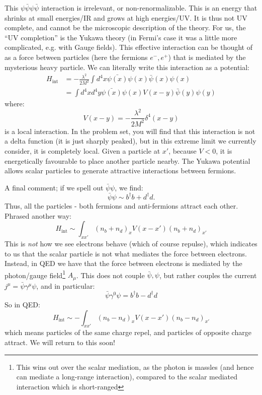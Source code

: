 This $\psi\bar{\psi}\psi\bar{\psi}$ interaction is irrelevant, or non-renormalizable. This is an energy that shrinks at small energies/IR and grows at high energies/UV. It is thus not UV complete, and cannot be the microscopic description of the theory. For us, the ``UV completion'' is the Yukawa theory (in Fermi's case it was a little more complicated, e.g. with Gauge fields). This effective interaction can be thought of as a force between particles (here the fermions $e^-, e^+$) that is mediated by the mysterious heavy particle. We can literally write this interaction as a potential:
\begin{equation}
    \begin{split}
        H_{\text{int}} &= -\frac{\lambda^2}{2M^2}\int d^4x \bar{\psi(x)}\psi(x)\bar{\psi}(x)\psi(x)
        \\ &=\int d^4xd^4y \bar{\psi(x)}\psi(x)V(x-y)\bar{\psi}(y)\psi(y)
    \end{split}
\end{equation}
where:
\begin{equation}
    V(x-y) = -\frac{\lambda^2}{2M^2}\delta^4(x-y)
\end{equation}
is a local interaction. In the problem set, you will find that this interaction is not a delta function (it is just sharply peaked), but in this extreme limit we currently consider, it is completely local. Given a particle at $x'$, because $V < 0$, it is energetically favourable to place another particle nearby. The Yukawa potential allows scalar particles to generate attractive interactions between fermions.

A final comment; if we spell out $\bar{\psi}\psi$, we find:
\begin{equation}
    \bar{\psi}\psi \sim b^\dag b + d^\dag d.
\end{equation}
Thus, all the particles - both fermions and anti-fermions attract each other. Phrased another way:
\begin{equation}
    H_{\text{int}} \sim \int_{xx'}(n_b + n_d)_xV(x - x')(n_b + n_d)_{x'}
\end{equation}
This is \emph{not} how we see electrons behave (which of course repulse), which indicates to us that the scalar particle is not what mediates the force between electrons. Instead, in QED we have that the force between electrons is mediated by the photon/gauge field\footnote{This wins out over the scalar mediation, as the photon is massles (and hence can mediate a long-range interaction), compared to the scalar mediated interaction which is short-ranged} $A_\mu$. This does not couple $\bar{\psi}, \psi$, but rather couples the current $j^\mu = \bar{\psi}\gamma^\mu \psi$, and in particular:
\begin{equation}
    \bar{\psi}\gamma^0 \psi = b^\dag b - d^\dag d
\end{equation}
So in QED:
\begin{equation}
    H_{\text{int}} \sim -\int_{xx'}(n_b - n_d)_xV(x - x')(n_b - n_d)_{x'}
\end{equation}
which means particles of the same charge repel, and particles of opposite charge attract. We will return to this soon!

